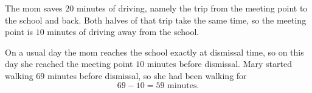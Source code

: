 The mom saves $20$ minutes of driving, namely the trip from the meeting point to the school and back. Both halves of that trip take the same time, so the meeting point is $10$ minutes of driving away from the school.

On a usual day the mom reaches the school exactly at dismissal time, so on this day she reached the meeting point $10$ minutes before dismissal. Mary started walking $69$ minutes before dismissal, so she had been walking for
\[69-10=\boxed{59}\text{ minutes}.\]
